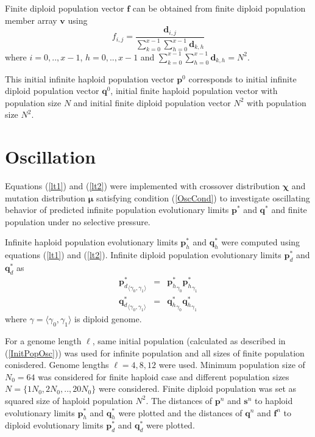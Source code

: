 Finite diploid population vector $\bm{f}$ can be obtained from finite diploid population member array $\bm{v}$  using
\[
f_{i,j} = \frac{\bm{d}_{i,j}}{\sum \limits_{k=0}^{x-1} \sum \limits_{h=0}^{x-1} \bm{d}_{k,h}}
\]
where $i = 0,.., x-1$, $h = 0,.., x-1$ and $\sum \limits_{k=0}^{x-1} \sum \limits_{h=0}^{x-1} \bm{d}_{k,h} = N^2$.

This initial infinite haploid population vector $\bm{p}^0$ corresponds to initial infinite diploid population vector $\bm{q}^0$, initial finite 
haploid population vector with population size $N$ and initial finite diploid population vector $N^2$ with population size $N^2$.

\section{Oscillation}
\label{Oscillation}

Equations (\ref{lt1}) and (\ref{lt2}) were implemented with crossover distribution $\bm{\chi}$ and mutation distribution $\bm{\mu}$ satisfying 
condition (\ref{OscCond}) to investigate oscillating behavior of predicted infinite population evolutionary limits $\bm{p}^{\ast}$ and $\bm{q}^{\ast}$ 
and finite population under no selective pressure.

Infinite haploid population evolutionary limits $\bm{p}_h^{\ast}$ and $\bm{q}_h^{\ast}$ were computed using equations (\ref{lt1}) and (\ref{lt2}). 
Infinite diploid population evolutionary limits $\bm{p}_d^{\ast}$ and $\bm{q}_d^{\ast}$ as
\begin{eqnarray*}
{\bm{p}_d^{\ast}}_{\langle \gamma_0, \gamma_1 \rangle} & = & {\bm{p}_h^{\ast}}_{\gamma_0} {\bm{p}_h^{\ast}}_{\gamma_1} \\
{\bm{q}_d^{\ast}}_{\langle \gamma_0, \gamma_1 \rangle} & = & {\bm{q}_h^{\ast}}_{\gamma_0} {\bm{q}_h^{\ast}}_{\gamma_1}
\end{eqnarray*}
where $\gamma = \langle \gamma_0, \gamma_1 \rangle$ is diploid genome.

For a genome length $\ell$, same initial population (calculated as described in (\ref{InitPopOsc})) was used for infinite population and all 
sizes of finite population conisdered.
Genome lengths $\ell = {4, 8, 12}$ were used. Minimum population size of $N_0 = 64$ was considered for finite haploid case and 
different population sizes $N = \{1N_0, 2N_0,.., 20N_0\}$ were considered. Finite diploid population was set as squared size of haploid 
population $N^2$.
The distances of $\bm{p}^n$ and $\bm{s}^n$ to haploid evolutionary limits $\bm{p}_h^{\ast}$ and $\bm{q}_h^{\ast}$ were plotted and the distances of $\bm{q}^n$ and 
$\bm{f}^n$ to diploid evolutionary limits $\bm{p}_d^{\ast}$ and $\bm{q}_d^{\ast}$ were plotted.


